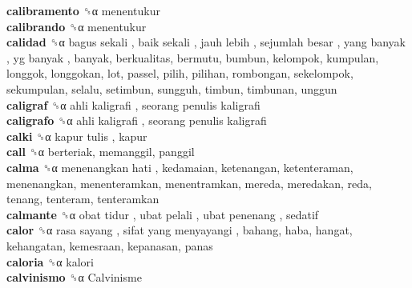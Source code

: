 \textbf{calibramento} ␝α  menentukur  \\
\textbf{calibrando} ␝α  menentukur  \\
\textbf{calidad} ␝α   bagus sekali ,  baik sekali ,  jauh lebih ,  sejumlah besar ,  yang banyak ,  yg banyak , banyak, berkualitas, bermutu, bumbun, kelompok, kumpulan, longgok, longgokan, lot, passel, pilih, pilihan, rombongan, sekelompok, sekumpulan, selalu, setimbun, sungguh, timbun, timbunan, unggun  \\
\textbf{caligraf} ␝α   ahli kaligrafi ,  seorang penulis kaligrafi   \\
\textbf{caligrafo} ␝α   ahli kaligrafi ,  seorang penulis kaligrafi   \\
\textbf{calki} ␝α   kapur tulis , kapur  \\
\textbf{call} ␝α  berteriak, memanggil, panggil  \\
\textbf{calma} ␝α   menenangkan hati , kedamaian, ketenangan, ketenteraman, menenangkan, menenteramkan, menentramkan, mereda, meredakan, reda, tenang, tenteram, tenteramkan  \\
\textbf{calmante} ␝α   obat tidur ,  ubat pelali ,  ubat penenang , sedatif  \\
\textbf{calor} ␝α   rasa sayang ,  sifat yang menyayangi , bahang, haba, hangat, kehangatan, kemesraan, kepanasan, panas  \\
\textbf{caloria} ␝α  kalori  \\
\textbf{calvinismo} ␝α   Calvinisme   \\
